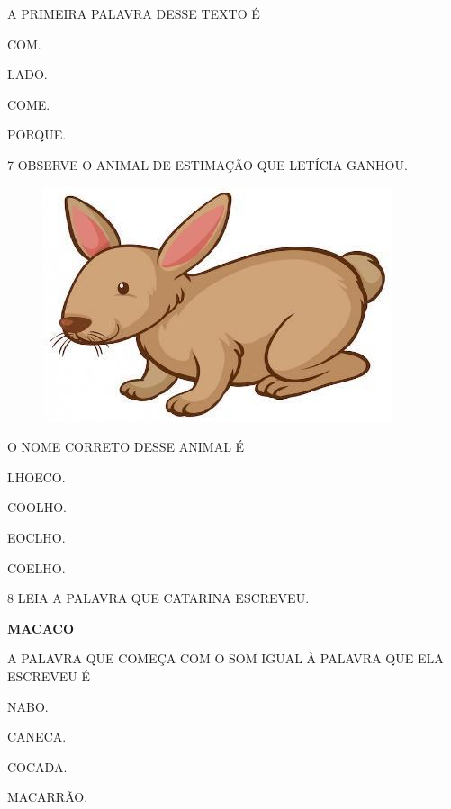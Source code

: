 A PRIMEIRA PALAVRA DESSE TEXTO É

\begin{escolha}
\item COM.

\item LADO.

\item COME.

\item PORQUE.
\end{escolha}


\num{7} OBSERVE O ANIMAL DE ESTIMAÇÃO QUE LETÍCIA GANHOU.

\begin{figure}[H]
\centering
\includegraphics[width=.6\textwidth]{media/image246.jpg}
\end{figure}

O NOME CORRETO DESSE ANIMAL É

\begin{escolha}
\item LHOECO.

\item COOLHO.

\item EOCLHO.

\item COELHO.
\end{escolha}

\num{8} LEIA A PALAVRA QUE CATARINA ESCREVEU.

\begin{myquote}
\centering\Large\textbf{MACACO}
\end{myquote}

A PALAVRA QUE COMEÇA COM O SOM IGUAL À PALAVRA QUE ELA ESCREVEU É 

\begin{escolha}
\item NABO.

\item CANECA.

\item COCADA.

\item MACARRÃO.
\end{escolha}

